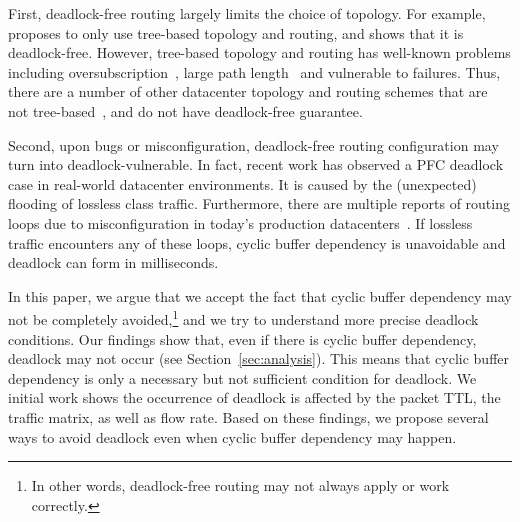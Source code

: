 First, deadlock-free routing largely limits the choice of topology. For example,
\cite{tcpbolt} proposes to only use tree-based topology and routing, and shows
that it is deadlock-free.  However, tree-based topology and routing has
well-known problems including oversubscription~\cite{fattree}, large path
length~\cite{jellyfish} and vulnerable to failures.  Thus, there are a number of
other datacenter topology and routing schemes that are not
tree-based~\cite{bcube, camcube, jellyfish}, and do not have deadlock-free
guarantee.

Second, upon bugs or misconfiguration, deadlock-free routing configuration may
turn into deadlock-vulnerable. In fact, recent work has observed a PFC deadlock
case in real-world datacenter environments\cite{rdmascale}. It is caused by the
(unexpected) flooding of lossless class traffic. Furthermore, there are multiple
reports of routing loops due to misconfiguration in today's production
datacenters~\cite{everflow, libra}. If lossless traffic encounters any of these
loops, cyclic buffer dependency is unavoidable and deadlock can form in
milliseconds.

In this paper, we argue that we accept the fact that cyclic buffer dependency
may not be completely avoided,\footnote{In other words, deadlock-free routing
may not always apply or work correctly.} and we try to understand more precise
deadlock conditions. Our findings show that, even if there is cyclic buffer
dependency, deadlock may not occur (see Section~\ref{sec:analysis}).  This means
that cyclic buffer dependency is only a necessary but not sufficient condition
for deadlock.  We initial work shows the occurrence of deadlock is affected by
the packet TTL, the traffic matrix, as well as flow rate. Based on these
findings, we propose several ways to avoid deadlock even when cyclic buffer
dependency may happen. 


